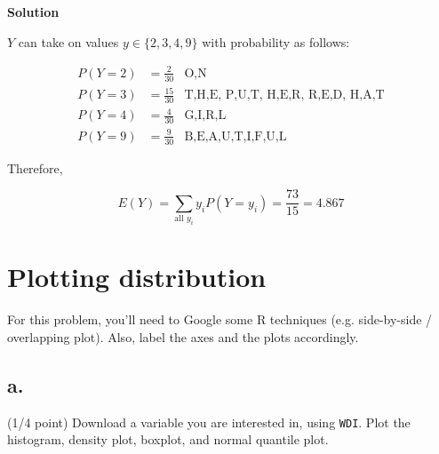\documentclass[12pt,letter]{article}\usepackage[]{graphicx}\usepackage[]{color}
\begin{document}
\textbf{Solution}

$Y$ can take on values $y \in \{2, 3, 4, 9 \}$ with probability as follows:

\begin{align}
P(Y = 2) &= \frac{2}{30} &\text{O,N} \\
P(Y = 3) &= \frac{15}{30} &\text{T,H,E, P,U,T, H,E,R, R,E,D, H,A,T} \\
P(Y = 4) &= \frac{4}{30} &\text{G,I,R,L} \\
P(Y = 9) &= \frac{9}{30} &\text{B,E,A,U,T,I,F,U,L}
\end{align}

Therefore,

$$E(Y) = \sum_{\text{all $y_i$}} y_i P(Y = y_i) = \frac{73}{15} = 4.867$$

\section{Plotting distribution}

For this problem, you'll need to Google some R techniques (e.g. side-by-side / overlapping plot). Also, label the axes and the plots accordingly.

\subsection*{a.} (1/4 point) Download a variable you are interested in, using \verb`WDI`. Plot the histogram, density plot, boxplot, and normal quantile plot.
\end{document}
